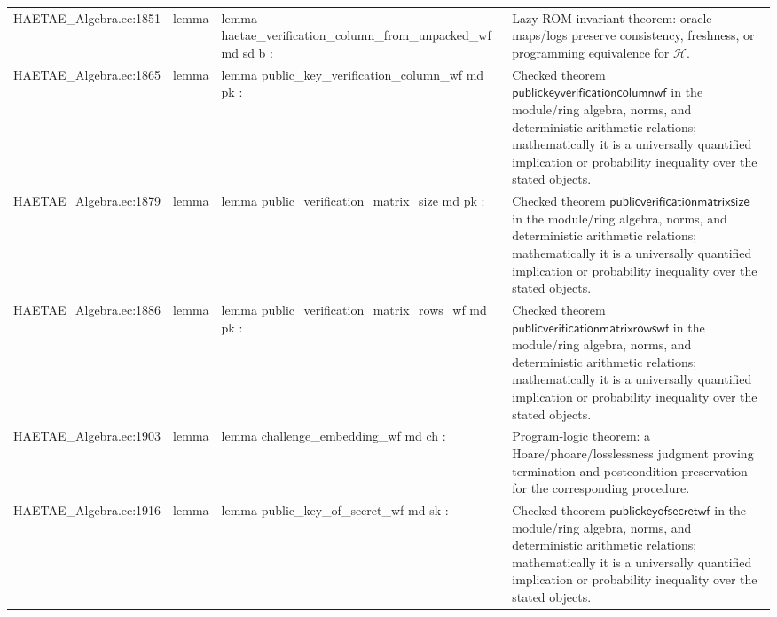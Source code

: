 \documentclass[10pt]{article}
\begin{document}
\begin{longtable}{L{0.11\textwidth}L{0.055\textwidth}L{0.385\textwidth}L{0.41\textwidth}}
HAETAE\_\allowbreak{}Algebra.\allowbreak{}ec:\allowbreak{}1851 & lemma & {\ttfamily\scriptsize lemma haetae\_\allowbreak{}verification\_\allowbreak{}column\_\allowbreak{}from\_\allowbreak{}unpacked\_\allowbreak{}wf md sd b :} & Lazy-ROM invariant theorem: oracle maps/logs preserve consistency, freshness, or programming equivalence for $\mathcal H$. \\
HAETAE\_\allowbreak{}Algebra.\allowbreak{}ec:\allowbreak{}1865 & lemma & {\ttfamily\scriptsize lemma public\_\allowbreak{}key\_\allowbreak{}verification\_\allowbreak{}column\_\allowbreak{}wf md pk :} & Checked theorem $\mathsf{publickeyverificationcolumnwf}$ in the module/ring algebra, norms, and deterministic arithmetic relations; mathematically it is a universally quantified implication or probability inequality over the stated objects. \\
HAETAE\_\allowbreak{}Algebra.\allowbreak{}ec:\allowbreak{}1879 & lemma & {\ttfamily\scriptsize lemma public\_\allowbreak{}verification\_\allowbreak{}matrix\_\allowbreak{}size md pk :} & Checked theorem $\mathsf{publicverificationmatrixsize}$ in the module/ring algebra, norms, and deterministic arithmetic relations; mathematically it is a universally quantified implication or probability inequality over the stated objects. \\
HAETAE\_\allowbreak{}Algebra.\allowbreak{}ec:\allowbreak{}1886 & lemma & {\ttfamily\scriptsize lemma public\_\allowbreak{}verification\_\allowbreak{}matrix\_\allowbreak{}rows\_\allowbreak{}wf md pk :} & Checked theorem $\mathsf{publicverificationmatrixrowswf}$ in the module/ring algebra, norms, and deterministic arithmetic relations; mathematically it is a universally quantified implication or probability inequality over the stated objects. \\
HAETAE\_\allowbreak{}Algebra.\allowbreak{}ec:\allowbreak{}1903 & lemma & {\ttfamily\scriptsize lemma challenge\_\allowbreak{}embedding\_\allowbreak{}wf md ch :} & Program-logic theorem: a Hoare/phoare/losslessness judgment proving termination and postcondition preservation for the corresponding procedure. \\
HAETAE\_\allowbreak{}Algebra.\allowbreak{}ec:\allowbreak{}1916 & lemma & {\ttfamily\scriptsize lemma public\_\allowbreak{}key\_\allowbreak{}of\_\allowbreak{}secret\_\allowbreak{}wf md sk :} & Checked theorem $\mathsf{publickeyofsecretwf}$ in the module/ring algebra, norms, and deterministic arithmetic relations; mathematically it is a universally quantified implication or probability inequality over the stated objects. \\

\end{longtable}
\end{document}
